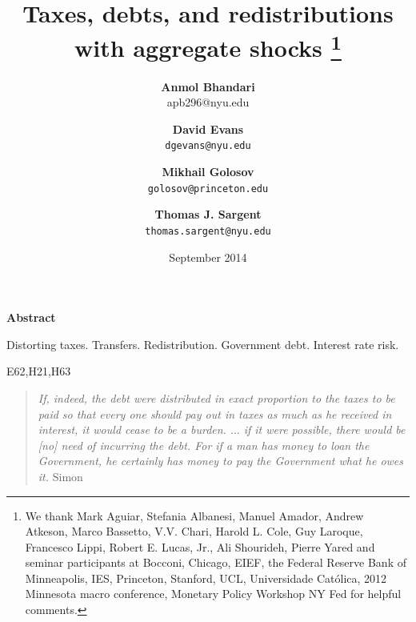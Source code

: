 \documentclass[11.5pt,twoside]{article}
\begin{document}
\author{\textbf{Anmol Bhandari}\\apb296@nyu.edu \and \textbf{David Evans} \\ \texttt{dgevans@nyu.edu} \and \textbf{Mikhail Golosov}\\\texttt{golosov@princeton.edu} \and \textbf{Thomas J. Sargent} \\ \texttt{thomas.sargent@nyu.edu}
}
\title{\textbf{Taxes, debts,  and redistributions with aggregate shocks%
\thanks{%
We thank Mark Aguiar, Stefania Albanesi, Manuel Amador,  Andrew Atkeson, Marco Bassetto, V.V. Chari, Harold
L. Cole, Guy Laroque, Francesco Lippi, Robert E. Lucas, Jr., Ali Shourideh, Pierre Yared and seminar
participants at Bocconi, Chicago, EIEF, the Federal Reserve Bank of
Minneapolis, IES, Princeton, Stanford, UCL, Universidade Cat\'{o}lica, 2012
Minnesota macro conference, Monetary Policy Workshop NY Fed for helpful
comments.}}}
\date{September 2014}
\maketitle

\begin{center}
\textbf{Abstract}
\end{center}

\medskip


\bigskip
{}Distorting taxes. Transfers. Redistribution.  Government debt.  Interest rate risk.

 E62,H21,H63
\thispagestyle{empty}\bigskip

\bigskip \newpage

\setcounter{page}{1}

\bigskip \baselineskip0.65cm


%




\begin{quote}
\emph{If, indeed, the debt were distributed in exact proportion to the taxes
to be paid so that every one should pay out in taxes as much as he received
in interest, it would cease to be a burden.%
$\ldots$ if it were possible, there
would be [no] need of incurring the debt. For if a man has money to loan the
Government, he certainly has money to pay the Government what he owes it.
}Simon \citet[p.85]{newcomb1865critical}
\end{quote}
\end{document}
